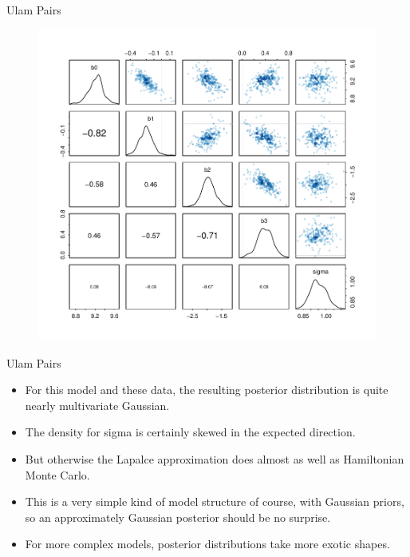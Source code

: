 \documentclass[handout]{beamer}
\begin{document}
\begin{frame}{Ulam Pairs}



 \begin{figure}[h!]
	\centering
	\includegraphics[scale=0.55]{pics/MCMC_pairs.pdf}
	\end{figure} 



\end{frame}


\begin{frame}[fragile]{Ulam Pairs}
\scriptsize{


\begin{itemize}


\item For this model and these data, the resulting posterior distribution is quite nearly multivariate Gaussian.
\item The density for sigma is certainly skewed in the expected direction. \item But otherwise the Lapalce approximation does almost as well as Hamiltonian Monte Carlo.
\item This is a very simple kind of model structure of course, with Gaussian priors, so an approximately Gaussian posterior should be no surprise. 
\item For more complex models, posterior distributions take more exotic shapes.

 \end{itemize}




} 
\end{frame}
\end{document}
